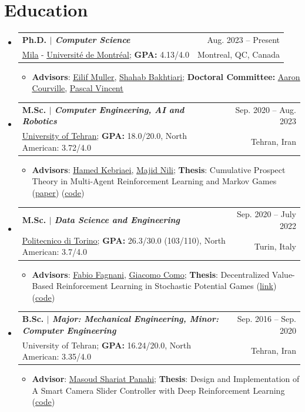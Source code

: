 \documentclass[A4,11pt]{article}
\makeatletter
\newcommand{\CVItem}[1]{
  \item\small{
    {#1 \vspace{-2pt}}
  }
}
\newcommand{\CVSubheading}[4]{
  \vspace{-2pt}\item
    \begin{tabular*}{0.97\textwidth}[t]{l@{\extracolsep{\fill}}r}
      \textbf{#1} & #2 \\
      \small#3 & \small #4 \\
    \end{tabular*}\vspace{-7pt}
}
\newcommand{\CVSubHeadingListStart}{\begin{itemize}[leftmargin=0.5cm, label={}]}
\newcommand{\CVSubHeadingListEnd}{\end{itemize}}
\newcommand{\CVItemListStart}{\begin{itemize}}
\newcommand{\CVItemListEnd}{\end{itemize}\vspace{-5pt}}
\makeatother
\begin{document}
\section{Education}
  \CVSubHeadingListStart
    \CVSubheading
      {{Ph.D. $|$ \emph{Computer Science}}}{Aug. 2023 -- Present}
      {\href{https://mila.quebec/en/}{\underline{Mila}} - \href{https://diro.umontreal.ca/english/home/}{\underline{Université de Montréal}}; \textbf{GPA:} 4.13/4.0}{Montreal, QC, Canada}
      \CVItemListStart
        \CVItem{\textbf{Advisors}: \href{https://scholar.google.ch/citations?user=r4-NZhwAAAAJ&hl=en}{\underline{Eilif Muller}},
        \href{https://scholar.google.com/citations?user=f_JDOhEAAAAJ&hl=en}{\underline{Shahab Bakhtiari}}; \textbf{Doctoral Committee:} \href{https://scholar.google.com/citations?hl=en&user=km6CP8cAAAAJ&view_op=list_works}{\underline{Aaron Courville}},
        \href{https://scholar.google.com/citations?hl=en&user=WBCKQMsAAAAJ&view_op=list_works}{\underline{Pascal Vincent}}}
      \CVItemListEnd
    \CVSubheading
      {{M.Sc. $|$ \emph{Computer Engineering, AI and Robotics}}}{Sep. 2020 -- Aug. 2023}
      {\href{https://ut.ac.ir/en}{\underline{University of Tehran}}; \textbf{GPA:} 18.0/20.0, North American: 3.72/4.0}{Tehran, Iran}
      \CVItemListStart
        \CVItem{\textbf{Advisors}: \href{https://scholar.google.com/citations?user=eDseLNYAAAAJ&hl=en}{\underline{Hamed Kebriaei}},
        \href{https://scholar.google.com/citations?user=QlwWxmoAAAAJ&hl=en}{\underline{Majid Nili}}; \textbf{Thesis}: Cumulative Prospect Theory in Multi-Agent Reinforcement Learning and Markov Games
        	(\href{https://arxiv.org/abs/2402.05906}{\underline{paper}}) (\href{https://github.com/hafezgh/risk-sensitive-marl-namg}{\underline{code}})}
      \CVItemListEnd
    \CVSubheading
      {{M.Sc. $|$ \emph{\small{Data Science and Engineering}}}}{Sep. 2020 -- July 2022}
      {\href{https://www.polito.it/en?lang=en}{\underline{Politecnico di Torino}}; \textbf{GPA:} 26.3/30.0 (103/110), North American: 3.7/4.0}{Turin, Italy}
      \CVItemListStart
        \CVItem{\textbf{Advisors}: \href{https://scholar.google.com/citations?user=oqwlDQEAAAAJ&hl=en}{\underline{Fabio Fagnani}},
        \href{https://scholar.google.com/citations?user=7dju3QoAAAAJ&hl=en}{\underline{Giacomo Como}}; \textbf{Thesis}: Decentralized Value-Based Reinforcement Learning in Stochastic Potential Games (\href{https://webthesis.biblio.polito.it/23450/}{\underline{link}}) (\href{https://github.com/hafezgh/PoliTo-MSc-Thesis}{\underline{code}})}
      \CVItemListEnd
    \CVSubheading
      {{B.Sc. $|$ \emph{\small{Major: Mechanical Engineering, Minor: Computer Engineering}}}}{Sep. 2016 -- Sep. 2020}
      {{University of Tehran}; \textbf{GPA:} 16.24/20.0, North American: 3.35/4.0}{Tehran, Iran}
    \CVItemListStart
        \CVItem{\textbf{Advisor}: \href{https://scholar.google.com/citations?user=UwlyBw0AAAAJ&hl=en}{\underline{Masoud Shariat Panahi}}; \textbf{Thesis}: Design and Implementation of A Smart Camera Slider Controller with Deep Reinforcement Learning (\href{https://github.com/hafezgh/bahcelor_thesis}{\underline{code}})}
    \CVItemListEnd
  \CVSubHeadingListEnd
\end{document}
